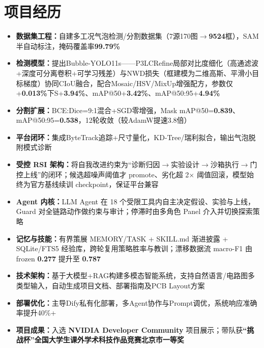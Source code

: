 \documentclass{resume}
\begin{document}
\section{项目经历}
\begin{itemize}[parsep=0.05ex]
  \item \textbf{数据集工程：}自建多工况气泡检测/分割数据集（7源170图$\to$\textbf{9524}框），SAM半自动标注，掩码覆盖率\textbf{99.79\%}
  \item \textbf{检测模型：}提出Bubble-YOLO11s——P3LCRefine局部对比度细化（高通滤波+深度可分离卷积+可学习残差）与NWD损失（框建模为二维高斯、平滑小目标梯度）协同CIoU融合，配合Mosaic/HSV/MixUp增强配方，参数仅+\textbf{0.013\%}下S+\textbf{3.94\%}、mAP@50+\textbf{3.42\%}、mAP@50:95+\textbf{4.94\%}
  \item \textbf{分割扩展：}BCE:Dice=9:1混合+SGD零增强，Mask mAP@50=\textbf{0.839}、mAP@50:95=\textbf{0.538}，12轮收敛（较AdamW提速3.8倍）
  \item \textbf{平台闭环：}集成ByteTrack追踪+尺寸量化，KD-Tree/瑞利拟合，输出气泡脱附模式诊断
\end{itemize}
\begin{itemize}[parsep=0.05ex]
  \item \textbf{受控 RSI 架构：}将自我改进约束为“诊断归因$\to$实验设计$\to$沙箱执行$\to$门控上线”的闭环；候选超噪声阈值才 promote、劣化超 2$\times$ 阈值回滚，模型始终为官方基线续训 checkpoint，保证平台兼容
  \item \textbf{Agent 内核：}LLM Agent 在 18 个受限工具内自主决定假设、实验与上线，Guard 对全链路动作做约束与审计；停滞时由多角色 Panel 介入并切换探索策略
  \item \textbf{记忆与技能：}有界策展 MEMORY/TASK + SKILL.md 渐进披露 + SQLite/FTS5 经验库，跨轮复用策略胜率与教训；漂移数据流 macro-F1 由 frozen \textbf{0.277} 提升至 \textbf{0.787}
\end{itemize}
\begin{itemize}[parsep=0.1ex]
  \item \textbf{技术架构：}基于大模型+RAG构建多模态智能系统，支持自然语言/电路图多类型输入，自动生成项目文档、部署指南及PCB Layout方案
  \item \textbf{部署优化：}主导Dify私有化部署，多Agent协作与Prompt调优，系统响应准确率提升40\%+
  \item \textbf{项目成果：}入选 \textbf{NVIDIA Developer Community} 项目展示；带队获\textbf{“挑战杯”全国大学生课外学术科技作品竞赛北京市一等奖}
\end{itemize}
\end{document}

